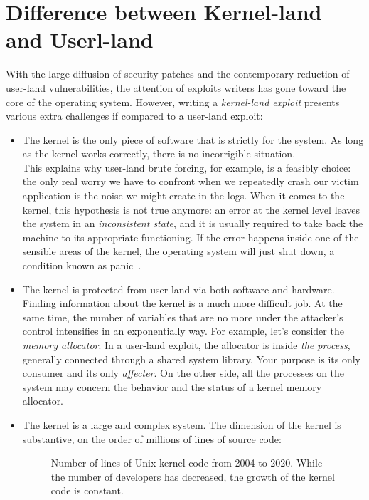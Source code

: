 \documentclass{masterthesis}
\begin{document}
\section{Difference between Kernel-land and Userl-land}
\label{sect:land}
With the large diffusion of security patches and the contemporary reduction of user-land vulnerabilities, the attention of exploits writers has gone toward the core of the operating system.
However, writing a \emph{kernel-land exploit} presents various extra challenges if compared to a user-land exploit:
\begin{itemize}
\item The kernel is the only piece of software that is strictly for the system. As long as the kernel works correctly, there is no incorrigible situation.\\
This explains why user-land brute forcing, for example, is a feasibly choice: the only real worry we have to confront when we repeatedly crash our victim application is the noise we might create in the logs.
When it comes to the kernel, this hypothesis is not true anymore: an error at the kernel level leaves the system in an \emph{inconsistent state}, and it is usually required to take back the machine to its appropriate functioning.
If the error happens inside one of the sensible areas of the kernel, the operating system will just shut down, a condition known as panic~\cite{cheng2021kernel}.
\item The kernel is protected from user-land via both software and hardware. Finding information about the kernel is a much more difficult job. At the same time, the number of variables that are no more under the attacker’s control intensifies in an exponentially way. For example, let's consider the \emph{memory allocator}.
In a user-land exploit, the allocator is inside \emph{the process}, generally connected through a shared system library. Your purpose is its only consumer and its only \emph{affecter}. On the other side, all the processes on the system may concern the behavior and the status of a kernel memory allocator.
\item The kernel is a large and complex system. The dimension of the kernel is substantive, on the order of millions of lines of source code:
\begin{figure}[h!]
\caption{Number of lines of Unix kernel code from 2004 to 2020. While the number of developers has decreased, the growth of the kernel code is constant.}
   \makebox[\textwidth][c]{\includegraphics[height=0.4
}
\end{figure}
\end{itemize}
\end{document}
